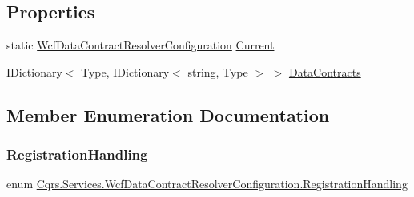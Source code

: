 \subsection*{Properties}
\begin{DoxyCompactItemize}
\item 
static \hyperlink{classCqrs_1_1Services_1_1WcfDataContractResolverConfiguration}{Wcf\+Data\+Contract\+Resolver\+Configuration} \hyperlink{classCqrs_1_1Services_1_1WcfDataContractResolverConfiguration_a22cf32559867b0a067950c4ce35504b2_a22cf32559867b0a067950c4ce35504b2}{Current}
\item 
I\+Dictionary$<$ Type, I\+Dictionary$<$ string, Type $>$ $>$ \hyperlink{classCqrs_1_1Services_1_1WcfDataContractResolverConfiguration_a8a764a7cebaf9ebdcdc1176a9fba0b3a_a8a764a7cebaf9ebdcdc1176a9fba0b3a}{Data\+Contracts}
\end{DoxyCompactItemize}


\subsection{Member Enumeration Documentation}
\mbox{\label{classCqrs_1_1Services_1_1WcfDataContractResolverConfiguration_acf6a145eb88c5d98b31a541cfb1fb152_acf6a145eb88c5d98b31a541cfb1fb152}} 
\subsubsection{\texorpdfstring{Registration\+Handling}{RegistrationHandling}}
{\footnotesize\ttfamily enum \hyperlink{classCqrs_1_1Services_1_1WcfDataContractResolverConfiguration_acf6a145eb88c5d98b31a541cfb1fb152_acf6a145eb88c5d98b31a541cfb1fb152}{Cqrs.\+Services.\+Wcf\+Data\+Contract\+Resolver\+Configuration.\+Registration\+Handling}\hspace{0.3cm}{\ttfamily [strong]}}

